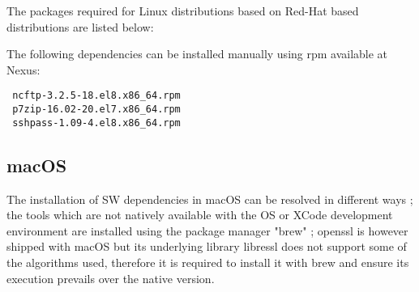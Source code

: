 \documentclass[dec_sum_main.tex]{subfiles}
\begin{document}
  The packages required for Linux distributions based on Red-Hat based distributions are listed below:
  \par
  \noindent
    \newline
    \newline 
    \newline
    \newline 
    \newline
    \newline
    \newline
    \newline
    \newline
  
 \par
 \noindent 
 The following dependencies can be installed manually using rpm available at Nexus:
 \begin{Verbatim}
 ncftp-3.2.5-18.el8.x86_64.rpm
 p7zip-16.02-20.el7.x86_64.rpm
 sshpass-1.09-4.el8.x86_64.rpm
 \end{Verbatim}
 
   \newline
 
 
 \subsection{macOS}
  The installation of SW dependencies in macOS can be resolved in different ways ; the tools which are not natively available with the OS or XCode development environment are installed using the package manager "brew" ; openssl is however shipped with macOS but its underlying library libressl does not support some of the algorithms used, therefore it is required to install it with brew and ensure its execution prevails over the native version.
 \par
  \noindent
    \newline
    \newline
    \newline
    \newline
 \par
 \noindent
 
\end{document}
